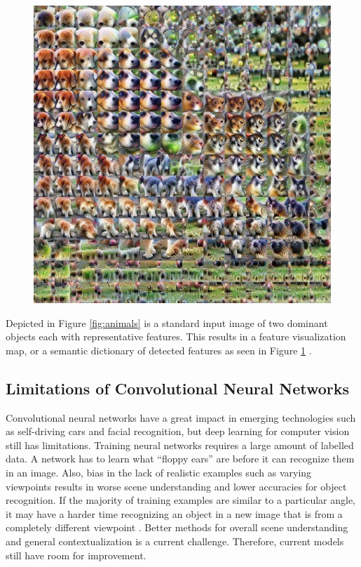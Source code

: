 \documentclass[12pt]{article}
\begin{document}
\begin{figure}[ht!]
\begin{minipage}[b]{0.4\textwidth}
    \includegraphics[width=\textwidth]{feature_visualization.JPG}
    \caption{}
    \label{fig:featureMap}
  \end{minipage}
\end{figure}

Depicted in Figure \ref{fig:animals} is a standard input image of two dominant objects each with representative features. This results in a feature visualization map, or a semantic dictionary of detected features as seen in Figure \ref{fig:featureMap} \cite{c14}.

\subsection{Limitations of Convolutional Neural Networks}
Convolutional neural networks have a great impact in emerging technologies such as self-driving cars and facial recognition, but deep learning for computer vision still has limitations. Training neural networks requires a large amount of labelled data. A network has to learn what “floppy ears” are before it can recognize them in an image. Also, bias in the lack of realistic examples such as varying viewpoints results in worse scene understanding and lower accuracies for object recognition. If the majority of training examples are similar to a particular angle, it may have a harder time recognizing an object in a new image that is from a completely different viewpoint \cite{c13}. Better methods for overall scene understanding and general contextualization is a current challenge. Therefore, current models still have room for improvement.
\end{document}
